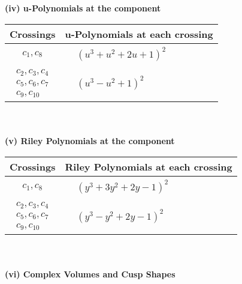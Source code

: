 \documentclass[1p]{elsarticle_modified}
\theoremstyle{definition}
\begin{document}
\newpage\renewcommand{\arraystretch}{1}
\flushleft \textbf{(iv) u-Polynomials at the component}\newline \\
\begin{tabular}{m{50pt}|m{274pt}}
Crossings & \hspace{64pt}u-Polynomials at each crossing \\
\hline $$\begin{aligned}c_{1},c_{8}\end{aligned}$$&$\begin{aligned}
&(u^3+u^2+2 u+1)^2
\end{aligned}$\\
\hline $$\begin{aligned}c_{2},c_{3},c_{4}\\c_{5},c_{6},c_{7}\\c_{9},c_{10}\end{aligned}$$&$\begin{aligned}
&(u^3- u^2+1)^2
\end{aligned}$\\
\hline
\end{tabular}\\~\\
\newpage\renewcommand{\arraystretch}{1}
\flushleft \textbf{(v) Riley Polynomials at the component}\newline \\
\begin{tabular}{m{50pt}|m{274pt}}
Crossings & \hspace{64pt}Riley Polynomials at each crossing \\
\hline $$\begin{aligned}c_{1},c_{8}\end{aligned}$$&$\begin{aligned}
&(y^3+3 y^2+2 y-1)^2
\end{aligned}$\\
\hline $$\begin{aligned}c_{2},c_{3},c_{4}\\c_{5},c_{6},c_{7}\\c_{9},c_{10}\end{aligned}$$&$\begin{aligned}
&(y^3- y^2+2 y-1)^2
\end{aligned}$\\
\hline
\end{tabular}\\~\\
\newpage\flushleft \textbf{(vi) Complex Volumes and Cusp Shapes}
\end{document}
